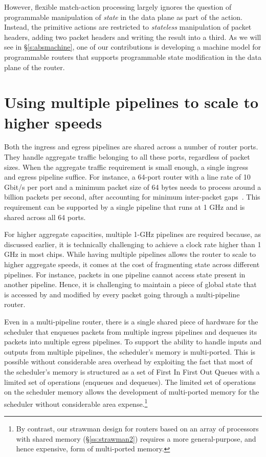 However, flexible match-action processing largely ignores the question of
programmable manipulation of {\em state} in the data plane as part of the
action.  Instead, the primitive actions are restricted to {\em stateless}
manipulation of packet headers, \eg adding two packet headers and writing the
result into a third. As we will see in \S\ref{s:absmachine}, one of our
contributions is developing a machine model for programmable routers that
supports programmable state modification in the data plane of the router. 

\section{Using multiple pipelines to scale to higher speeds}
\label{s:router_multi_pipeline_arch}

Both the ingress and egress pipelines are shared across a number of router
ports.  They handle aggregate traffic belonging to all these ports, regardless
of packet sizes. When the aggregate traffic requirement is small enough, a
single ingress and egress pipeline suffice. For instance, a 64-port router with
a line rate of 10 Gbit/s per port and a minimum packet size of 64 bytes needs
to process around a billion packets per second, after accounting for minimum
inter-packet gaps~\cite{rmt}.  This requirement can be supported by a single
pipeline that runs at 1 GHz and is shared across all 64 ports.

For higher aggregate capacities, multiple 1-GHz pipelines are required because,
as discussed earlier, it is technically challenging to achieve a clock rate
higher than 1 GHz in most chips. While having multiple pipelines allows the
router to scale to higher aggregate speeds, it comes at the cost of fragmenting
state across different pipelines.  For instance, packets in one pipeline cannot
access state present in another pipeline. Hence, it is challenging to maintain
a piece of global state that is accessed by and modified by every packet going
through a multi-pipeline router.

Even in a multi-pipeline router, there is a single shared piece of hardware for
the scheduler that enqueues packets from multiple ingress pipelines and
dequeues its packets into multiple egress pipelines. To support the ability to
handle inputs and outputs from multiple pipelines, the scheduler's memory is
multi-ported.  This is possible without considerable area overhead by
exploiting the fact that most of the scheduler's memory is structured as a set
of First In First Out Queues with a limited set of operations (\ie enqueues and
dequeues). The limited set of operations on the scheduler memory allows the
development of multi-ported memory for the scheduler without considerable area
expense.\footnote{By contrast, our strawman design for routers based on an
array of processors with shared memory (\S\ref{ss:strawman2}) requires a more
general-purpose, and hence expensive, form of multi-ported memory.}


